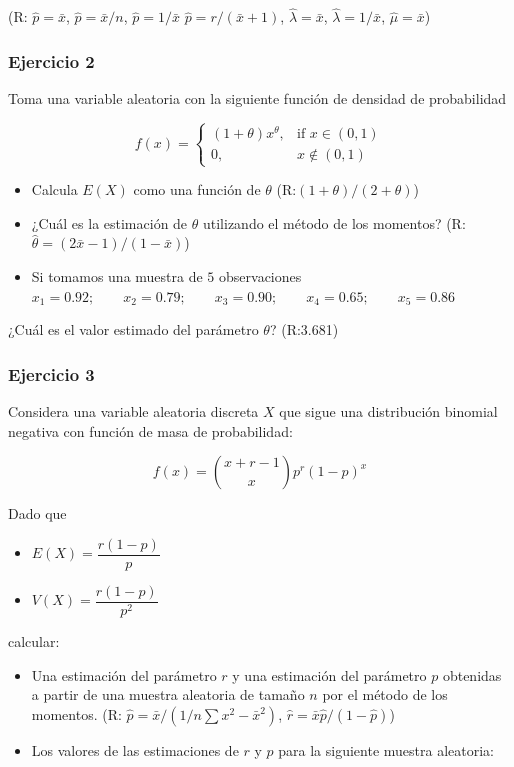 \documentclass[
]{book}
\providecommand{\tightlist}{%
  \setlength{\itemsep}{0pt}\setlength{\parskip}{0pt}}
\begin{document}
(R: \(\hat{p}=\bar{x}\),
\(\hat{p}=\bar{x}/n\),
\(\hat{p}=1/\bar{x}\)
\(\hat{p}=r/(\bar{x}+1)\),
\(\hat{\lambda}=\bar{x}\),
\(\hat{\lambda}=1/\bar{x}\),
\(\hat{\mu}=\bar{x}\))

\hypertarget{ejercicio-2-10}{%
\subsubsection{Ejercicio 2}\label{ejercicio-2-10}}

Toma una variable aleatoria con la siguiente función de densidad de probabilidad

\[
f(x)=
\begin{cases}
    (1+\theta)x^\theta,& \text{if } x\in (0,1)\\
    0,& x\notin (0,1)
\end{cases}
\]

\begin{itemize}
\tightlist
\item
  Calcula \(E(X)\) como una función de \(\theta\) (R:\((1+\theta)/(2+\theta)\))
\item
  ¿Cuál es la estimación de \(\theta\) utilizando el método de los momentos? (R:\(\hat{\theta}=(2\bar{x}-1)/(1-\bar{x})\))
\item
  Si tomamos una muestra de \(5\) observaciones
  \(x_1 = 0.92; \qquad x_2 = 0.79; \qquad x_3 = 0.90; \qquad x_4 = 0.65; \qquad x_5 = 0.86\)
\end{itemize}

¿Cuál es el valor estimado del parámetro \(\theta\)? (R:3.681)

\hypertarget{ejercicio-3-7}{%
\subsubsection{Ejercicio 3}\label{ejercicio-3-7}}

Considera una variable aleatoria discreta \(X\) que sigue una distribución binomial negativa con función de masa de probabilidad:

\[f(x) = \binom{x+r-1}{x}p^r(1-p)^x\]

Dado que

\begin{itemize}
\tightlist
\item
  \(E(X)=\dfrac{r(1-p)}{p}\)
\item
  \(V(X) =\dfrac{r(1-p)}{p^2}\)
\end{itemize}

calcular:

\begin{itemize}
\item
  Una estimación del parámetro \(r\) y una estimación del parámetro \(p\) obtenidas a partir de una muestra aleatoria de tamaño \(n\) por el método de los momentos. (R: \(\hat{p}=\bar{x}/({1/n \sum x^2}-\bar{x}^2)\), \(\hat{r}=\bar{x}\hat{p}/(1-\hat{p})\))
\item
  Los valores de las estimaciones de \(r\) y \(p\) para la siguiente muestra aleatoria:
\end{itemize}
\end{document}
